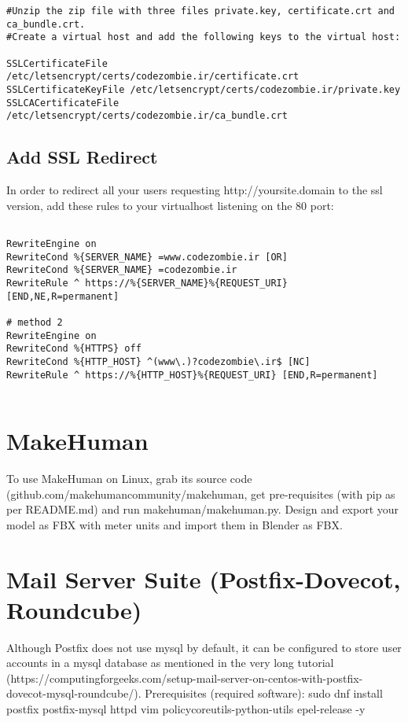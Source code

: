 \documentclass{article}
\begin{document}
\begin{verbatim}
#Unzip the zip file with three files private.key, certificate.crt and ca_bundle.crt.  
#Create a virtual host and add the following keys to the virtual host:  

SSLCertificateFile  /etc/letsencrypt/certs/codezombie.ir/certificate.crt
SSLCertificateKeyFile /etc/letsencrypt/certs/codezombie.ir/private.key
SSLCACertificateFile    /etc/letsencrypt/certs/codezombie.ir/ca_bundle.crt

\end{verbatim}

\subsection{Add SSL Redirect}
In order to redirect all your users requesting http://yoursite.domain to the ssl version, add these rules to your virtualhost listening on the 80 port: 
\begin{verbatim}

RewriteEngine on
RewriteCond %{SERVER_NAME} =www.codezombie.ir [OR]
RewriteCond %{SERVER_NAME} =codezombie.ir
RewriteRule ^ https://%{SERVER_NAME}%{REQUEST_URI} [END,NE,R=permanent]

# method 2
RewriteEngine on
RewriteCond %{HTTPS} off
RewriteCond %{HTTP_HOST} ^(www\.)?codezombie\.ir$ [NC]
RewriteRule ^ https://%{HTTP_HOST}%{REQUEST_URI} [END,R=permanent]


\end{verbatim}

\section{MakeHuman}
To use MakeHuman on Linux, grab its source code (github.com/makehumancommunity/makehuman, get pre-requisites (with pip as per README.md) and run makehuman/makehuman.py. Design and export your model as FBX with meter units and import them in Blender as FBX. 


\section{Mail Server Suite (Postfix-Dovecot, Roundcube)}
Although Postfix does not use mysql by default, it can be configured to store user accounts in a mysql database as mentioned in the very long tutorial (https://computingforgeeks.com/setup-mail-server-on-centos-with-postfix-dovecot-mysql-roundcube/).
Prerequisites (required software): 
sudo dnf install postfix postfix-mysql httpd vim policycoreutils-python-utils epel-release -y
\end{document}
